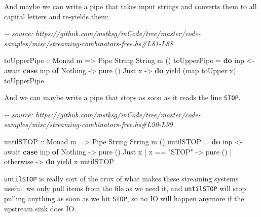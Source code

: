 \documentclass[]{article}
\newenvironment{Shaded}{}{}
\newcommand{\CommentTok}[1]{\textcolor[rgb]{0.38,0.63,0.69}{\textit{#1}}}
\newcommand{\DataTypeTok}[1]{\textcolor[rgb]{0.56,0.13,0.00}{#1}}
\newcommand{\FunctionTok}[1]{\textcolor[rgb]{0.02,0.16,0.49}{#1}}
\newcommand{\KeywordTok}[1]{\textcolor[rgb]{0.00,0.44,0.13}{\textbf{#1}}}
\newcommand{\NormalTok}[1]{#1}
\newcommand{\OperatorTok}[1]{\textcolor[rgb]{0.40,0.40,0.40}{#1}}
\newcommand{\OtherTok}[1]{\textcolor[rgb]{0.00,0.44,0.13}{#1}}
\newcommand{\StringTok}[1]{\textcolor[rgb]{0.25,0.44,0.63}{#1}}
\begin{document}
And maybe we can write a pipe that takes input strings and converts them to all
capital letters and re-yields them:

\begin{Shaded}
\begin{Highlighting}[]
\CommentTok{{-}{-} source: https://github.com/mstksg/inCode/tree/master/code{-}samples/misc/streaming{-}combinators{-}free.hs\#L81{-}L88}

\OtherTok{toUpperPipe ::} \DataTypeTok{Monad}\NormalTok{ m }\OtherTok{=>} \DataTypeTok{Pipe} \DataTypeTok{String} \DataTypeTok{String}\NormalTok{ m ()}
\NormalTok{toUpperPipe }\OtherTok{=} \KeywordTok{do}
\NormalTok{    inp }\OtherTok{<{-}}\NormalTok{ await}
    \KeywordTok{case}\NormalTok{ inp }\KeywordTok{of}
      \DataTypeTok{Nothing} \OtherTok{{-}>} \FunctionTok{pure}\NormalTok{ ()}
      \DataTypeTok{Just}\NormalTok{ x  }\OtherTok{{-}>} \KeywordTok{do}
\NormalTok{        yield (}\FunctionTok{map} \FunctionTok{toUpper}\NormalTok{ x)}
\NormalTok{        toUpperPipe}
\end{Highlighting}
\end{Shaded}

And we can maybe write a pipe that stops as soon as it reads the line
\texttt{STOP}.

\begin{Shaded}
\begin{Highlighting}[]
\CommentTok{{-}{-} source: https://github.com/mstksg/inCode/tree/master/code{-}samples/misc/streaming{-}combinators{-}free.hs\#L90{-}L99}

\OtherTok{untilSTOP ::} \DataTypeTok{Monad}\NormalTok{ m }\OtherTok{=>} \DataTypeTok{Pipe} \DataTypeTok{String} \DataTypeTok{String}\NormalTok{ m ()}
\NormalTok{untilSTOP }\OtherTok{=} \KeywordTok{do}
\NormalTok{    inp }\OtherTok{<{-}}\NormalTok{ await}
    \KeywordTok{case}\NormalTok{ inp }\KeywordTok{of}
      \DataTypeTok{Nothing} \OtherTok{{-}>} \FunctionTok{pure}\NormalTok{ ()}
      \DataTypeTok{Just}\NormalTok{ x}
        \OperatorTok{|}\NormalTok{ x }\OperatorTok{==} \StringTok{"STOP"} \OtherTok{{-}>} \FunctionTok{pure}\NormalTok{ ()}
        \OperatorTok{|} \FunctionTok{otherwise}   \OtherTok{{-}>} \KeywordTok{do}
\NormalTok{            yield x}
\NormalTok{            untilSTOP}
\end{Highlighting}
\end{Shaded}

\texttt{untilSTOP} is really sort of the crux of what makes these streaming
systems useful: we only pull items from the file as we need it, and
\texttt{untilSTOP} will stop pulling anything as soon as we hit \texttt{STOP},
so no IO will happen anymore if the upstream sink does IO.
\end{document}
